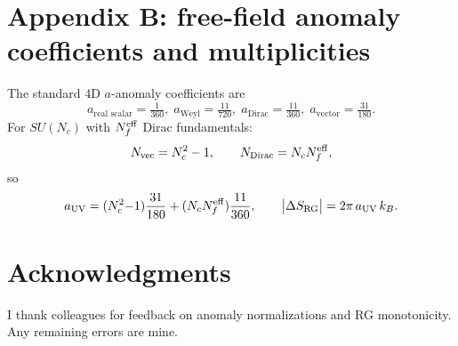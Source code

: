 \documentclass[11pt]{article}
\begin{document}
\section*{Appendix B: free-field anomaly coefficients and multiplicities}
The standard $4$D $a$-anomaly coefficients are~\cite{Duff,Anselmi}
\[
a_{\text{real scalar}}=\tfrac{1}{360},\;
a_{\text{Weyl}}=\tfrac{11}{720},\;
a_{\text{Dirac}}=\tfrac{11}{360},\;
a_{\text{vector}}=\tfrac{31}{180}.
\]
For $SU(N_c)$ with $N_f^{\rm eff}$ Dirac fundamentals:
\[
N_{\rm vec}=N_c^2-1,\qquad N_{\rm Dirac}=N_c N_f^{\rm eff},
\]
so
\[
a_{\rm UV}=(N_c^2{-}1)\frac{31}{180}+(N_c N_f^{\rm eff})\frac{11}{360},\qquad
\big|\Delta S_{\rm RG}\big|=2\pi\,a_{\rm UV}\,k_B.
\]

\section*{Acknowledgments}
I thank colleagues for feedback on anomaly normalizations and RG monotonicity. Any remaining errors are mine.
\end{document}
